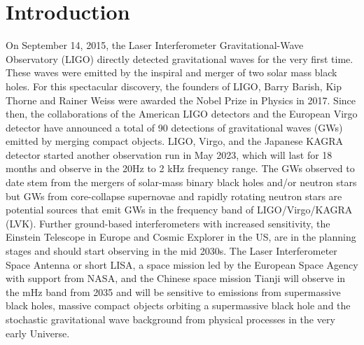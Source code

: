 \documentclass[%
 reprint,
 amsmath,amssymb,
 aps,
]{revtex4-2}
\begin{document}
\section{\label{sec:introduction} Introduction}
On September 14, 2015, the Laser Interferometer Gravitational-Wave Observatory (LIGO) directly detected gravitational waves for the very first time. These waves were emitted by the inspiral and merger of two solar mass black holes. For this spectacular discovery, the founders of LIGO, Barry Barish, Kip Thorne and Rainer Weiss were awarded the Nobel Prize in Physics in 2017.  Since then, the collaborations of the American LIGO detectors and the European Virgo detector have announced a total of 90 detections of gravitational waves (GWs) emitted by merging compact objects. LIGO, Virgo, and the Japanese KAGRA detector started another observation run in May 2023, which will last for 18 months and observe in the 20Hz to 2 kHz frequency range. The GWs observed to date stem from the mergers of solar-mass binary black holes and/or neutron stars but GWs from core-collapse supernovae and rapidly rotating neutron stars are potential sources that emit GWs in the frequency band of LIGO/Virgo/KAGRA (LVK).
Further ground-based interferometers with increased sensitivity, the Einstein Telescope in Europe and Cosmic Explorer in the US, are in the planning stages and should start observing in the mid 2030s. The Laser Interferometer Space Antenna or short LISA, a space mission led by the European Space Agency with support from NASA, and the Chinese space mission Tianji will observe in the mHz band from 2035 and will be sensitive to emissions from supermassive black holes, massive compact objects orbiting a supermassive black hole and the stochastic gravitational wave background from physical processes in the very early Universe.
\end{document}
